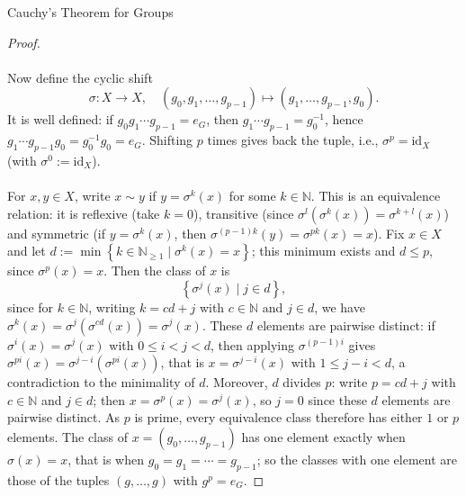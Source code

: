 \begin{appendixitem}{Cauchy's Theorem for Groups}
\begin{proof}
        \\\\
        Now define the cyclic shift
        \[
            \sigma \colon X \to X, \quad \left(g_{0}, g_{1}, \dots, g_{p-1}\right) \mapsto \left(g_{1}, \dots, g_{p-1}, g_{0}\right).
        \]
        It is well defined: if \( g_{0} g_{1} \cdots g_{p-1} = e_{G} \), then \( g_{1} \cdots g_{p-1} = g_{0}^{-1} \), hence \( g_{1} \cdots g_{p-1} g_{0} = g_{0}^{-1} g_{0} = e_{G} \). Shifting \( p \) times gives back the tuple, i.e., \( \sigma^{p} = \mathrm{id}_{X} \) (with \( \sigma^{0} := \mathrm{id}_{X} \)).
        \\\\
        For \( x, y \in X \), write \( x \sim y \) if \( y = \sigma^{k}\left(x\right) \) for some \( k \in \mathbb{N} \). This is an equivalence relation: it is reflexive (take \( k = 0 \)), transitive (since \( \sigma^{l}\left(\sigma^{k}\left(x\right)\right) = \sigma^{k+l}\left(x\right) \)) and symmetric (if \( y = \sigma^{k}\left(x\right) \), then \( \sigma^{\left(p-1\right)k}\left(y\right) = \sigma^{pk}\left(x\right) = x \)). Fix \( x \in X \) and let \( d := \min\left\{ k \in \mathbb{N}_{\geq 1} \mid \sigma^{k}\left(x\right) = x \right\} \); this minimum exists and \( d \leq p \), since \( \sigma^{p}\left(x\right) = x \). Then the class of \( x \) is
        \[
            \left\{ \sigma^{j}\left(x\right) \mid j \in d \right\},
        \]
        since for \( k \in \mathbb{N} \), writing \( k = cd + j \) with \( c \in \mathbb{N} \) and \( j \in d \), we have \( \sigma^{k}\left(x\right) = \sigma^{j}\left(\sigma^{cd}\left(x\right)\right) = \sigma^{j}\left(x\right) \). These \( d \) elements are pairwise distinct: if \( \sigma^{i}\left(x\right) = \sigma^{j}\left(x\right) \) with \( 0 \leq i < j < d \), then applying \( \sigma^{\left(p-1\right)i} \) gives \( \sigma^{pi}\left(x\right) = \sigma^{j-i}\left(\sigma^{pi}\left(x\right)\right) \), that is \( x = \sigma^{j-i}\left(x\right) \) with \( 1 \leq j - i < d \), a contradiction to the minimality of \( d \). Moreover, \( d \) divides \( p \): write \( p = cd + j \) with \( c \in \mathbb{N} \) and \( j \in d \); then \( x = \sigma^{p}\left(x\right) = \sigma^{j}\left(x\right) \), so \( j = 0 \) since these \( d \) elements are pairwise distinct. As \( p \) is prime, every equivalence class therefore has either \( 1 \) or \( p \) elements. The class of \( x = \left(g_{0}, \dots, g_{p-1}\right) \) has one element exactly when \( \sigma\left(x\right) = x \), that is when \( g_{0} = g_{1} = \cdots = g_{p-1} \); so the classes with one element are those of the tuples \( \left(g, \dots, g\right) \) with \( g^{p} = e_{G} \).

\end{proof}
\end{appendixitem}
